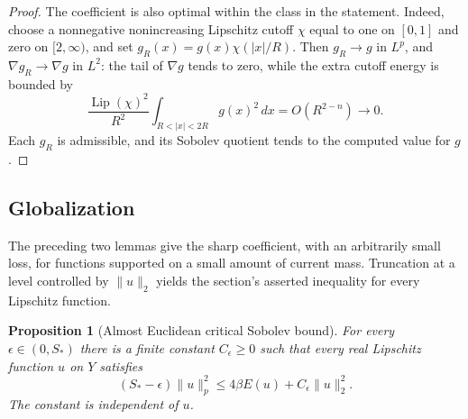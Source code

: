 \documentclass[11pt]{article}
\numberwithin{equation}{section}
\newtheorem{proposition}[theorem]{Proposition}
\theoremstyle{definition}
\theoremstyle{remark}
\begin{document}
\begin{proof}
The coefficient is also optimal within the class in the statement.
Indeed, choose a nonnegative nonincreasing Lipschitz cutoff $\chi$
equal to one on $[0,1]$ and zero on $[2,\infty)$, and set
$g_R(x)=g(x)\chi(|x|/R)$.  Then $g_R\to g$ in $L^p$, and
$\nabla g_R\to\nabla g$ in $L^2$: the tail of $\nabla g$ tends to
zero, while the extra cutoff energy is bounded by
\[
 \frac{\operatorname{Lip}(\chi)^2}{R^2}
       \int_{R<|x|<2R}g(x)^2\,d x=O(R^{2-n})\longrightarrow0.
\]
Each $g_R$ is admissible, and its Sobolev quotient tends to the
computed value for $g$.
\end{proof}

\subsection{Globalization}

The preceding two lemmas give the sharp coefficient, with an
arbitrarily small loss, for functions supported on a small amount of
current mass. Truncation at a level controlled by $\|u\|_2$ yields the
section's asserted inequality for every Lipschitz function.

\begin{proposition}[Almost Euclidean critical Sobolev bound]
\label{prop:almost-sobolev}
For every $\epsilon\in(0,S_*)$ there is a finite constant
$C_\epsilon\ge0$ such that every real Lipschitz function $u$ on $Y$
satisfies
\begin{equation}
 (S_*-\epsilon)\|u\|_p^2
     \le4\beta E(u)+C_\epsilon\|u\|_2^2.
 \label{eq:almost-sobolev}
\end{equation}
The constant is independent of $u$.
\end{proposition}
\end{document}
